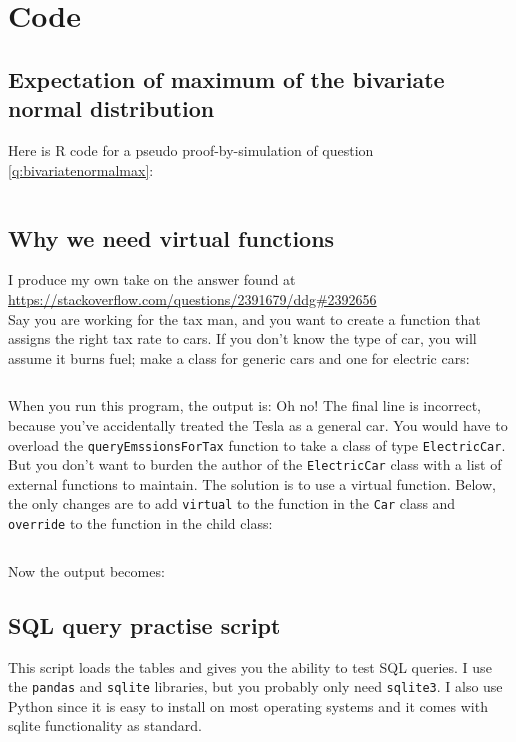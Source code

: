 \documentclass[a4paper]{article}
\begin{document}
\section{Code}
\subsection{Expectation of maximum of the bivariate normal distribution}
\label{ap:mvtnormproof}
Here is R code for a pseudo proof-by-simulation of question \ref{q:bivariatenormalmax}:

\inputminted{r}{./plots/mvtnorm/simtest.R}


\subsection{Why we need virtual functions}
\label{ap:virtualfunctions}
I produce my own take on the answer found at \\
\url{https://stackoverflow.com/questions/2391679/ddg#2392656}\\
Say you are working for the tax man, and you want to create a function that assigns the right tax rate to cars.
If you don't know the type of car, you will assume it burns fuel; make a class for generic cars and one for electric cars:
\inputminted{cpp}{./plots/virtualfunction/WithoutVirtual.cpp}
When you run this program, the output is:
Oh no! The final line is incorrect, because you've accidentally treated the Tesla as a general car.
You would have to overload the \verb+queryEmssionsForTax+ function to take a
class of type
\verb+ElectricCar+.
But you don't want to burden the author of the
\verb+ElectricCar+
class with a list of external functions to maintain.
The solution is to use a virtual function.
Below, the only changes are to add
\verb+virtual+
to the function in the
\verb+Car+
class and
\verb+override+
to the function in the child class:
\inputminted{cpp}{./plots/virtualfunction/WithVirtual.cpp}
Now the output becomes:

\subsection{SQL query practise script}
\label{ap:sqlite}
This script loads the tables and gives you the ability to test SQL queries.
I use the \verb+pandas+ and \verb+sqlite+ libraries, but you probably only need \verb+sqlite3+.
I also use Python since it is easy to install on most operating systems and it comes with sqlite functionality as standard.
\inputminted{python}{./plots/sql/sql.py}
\end{document}
